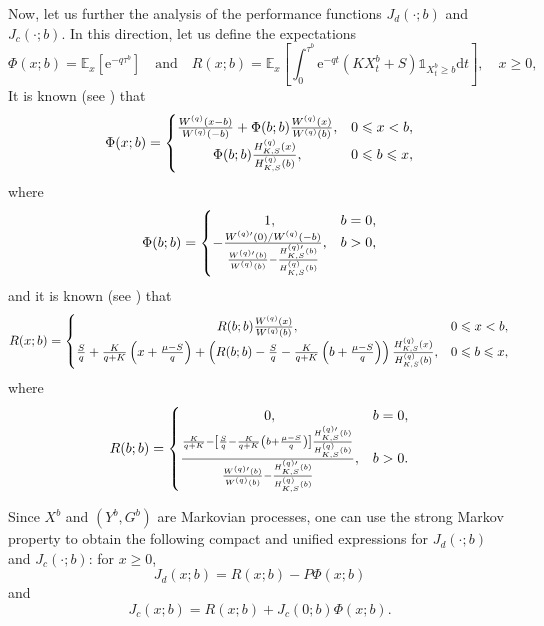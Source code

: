 \documentclass[11pt,reqno]{amsart}
\newcommand{\E}{\mathbb{E}}
\newcommand{\e}{\mathrm{e}}
\newcommand{\ind}{\mathds{1}}
\newcommand{\Wq}{W^{(q)}}
\newcommand{\Wqprime}{W^{(q) \prime}}
\newcommand{\Hq}{H^{(q)}_{K,S}}
\newcommand{\Hqprime}{H^{(q) \prime}_{K,S}}
\newcommand{\diff}{\mathrm{d}}
\newcommand{\ettap}[1]{\frac{S}{q} + \frac{K}{q+K}\left(#1 + \frac{\mu - S}{q}\right)}
\newcommand{\ettam}[1]{\frac{S}{q} - \frac{K}{q+K}\left(#1 + \frac{\mu - S}{q}\right)}
\renewcommand{\geq}{\geqslant}
\renewcommand{\leq}{\leqslant}
\begin{document}
Now, let us further the analysis of the performance functions $J_d(\cdot; b)$ and $J_c(\cdot; b)$. In this direction, let us define the expectations
\begin{equation}
\Phi(x;b) = \E_x\left[\e^{-q \tau^b}\right] \quad \text{and} \quad R(x;b) = \E_x\left[\int_0^{\tau^b}\e^{-qt}(KX^b_t + S)\ind_{X^b_t\geq b}\diff t\right], \quad x\geq 0 ,
\end{equation}
It is known (see \cite{mastromonaco_2025, renaud-et-al_2023}) that
\begin{equation}
    \Phi(x;b) =
    \begin{cases}
        \frac{\Wq(x-b)}{\Wq(-b)} +\Phi(b;b)\frac{\Wq(x)}{\Wq(b)}, &0\leq x< b, \\
        \hfil \Phi(b;b)\frac{\Hq(x)}{\Hq(b)}, &0\leq b \leq x,
    \end{cases}    
\end{equation}
where
\begin{equation}
    \Phi(b;b) = 
    \begin{cases}
        \hfil 1, &b = 0, \\
        -\frac{\Wqprime(0)/\Wq(-b)}{\frac{\Wqprime(b)}{\Wq(b)}-\frac{\Hqprime(b)}{\Hq(b)}}, &b>0,
    \end{cases} 
\end{equation}
and it is known (see \cite{renaud-simard_2021, rao_2023}) that
\begin{equation}
    R(x;b) =
    \begin{cases}
        \hfil R(b;b)\frac{\Wq(x)}{\Wq(b)}, &0\leq x< b, \\
        \ettap{x}+ \left( R(b;b) - \ettam{b} \right) \frac{\Hq(x)}{\Hq(b)}, &0\leq b \leq x,
    \end{cases}     
\end{equation}
where
\begin{equation}
    R(b;b) = 
    \begin{cases}
        \hfil 0, &b = 0, \\
        \frac{\frac{K}{q+K} - \left[\ettam{b}\right] \frac{\Hqprime(b)}{\Hq(b)}}{\frac{\Wqprime(b)}{\Wq(b)}-\frac{\Hqprime(b)}{\Hq(b)}}, &b>0.
    \end{cases}
\end{equation}

Since $X^b$ and $(Y^b, G^b)$ are Markovian processes, one can use the strong Markov property to obtain the following compact and unified expressions for $J_d(\cdot; b)$ and $J_c (\cdot; b)$: for $x\geq 0$,
\begin{equation}\label{Jd-compact}
J_d(x;b) = R(x;b) - P\Phi(x;b)
\end{equation}
and
\begin{equation}\label{Jc-compact}
    J_c(x;b) = R(x;b) + J_c(0;b)\Phi(x;b) .
\end{equation}
\end{document}
